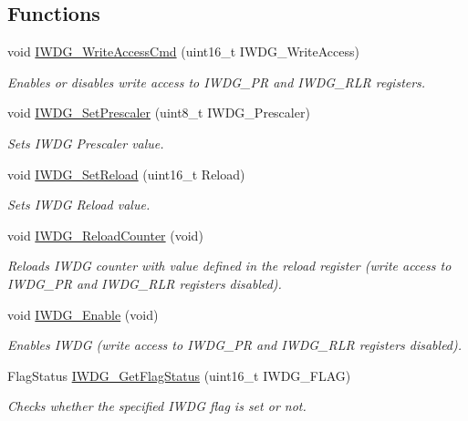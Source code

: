 \subsection*{Functions}
\begin{DoxyCompactItemize}
\item 
void \hyperlink{group___i_w_d_g_gae466681e5bdc11b353c508b89d75ca05}{I\-W\-D\-G\-\_\-\-Write\-Access\-Cmd} (uint16\-\_\-t I\-W\-D\-G\-\_\-\-Write\-Access)
\begin{DoxyCompactList}\small\item\em Enables or disables write access to I\-W\-D\-G\-\_\-\-P\-R and I\-W\-D\-G\-\_\-\-R\-L\-R registers. \end{DoxyCompactList}\item 
void \hyperlink{group___i_w_d_g_ga4fa7f1cd690533a35ad9e4729c0450a3}{I\-W\-D\-G\-\_\-\-Set\-Prescaler} (uint8\-\_\-t I\-W\-D\-G\-\_\-\-Prescaler)
\begin{DoxyCompactList}\small\item\em Sets I\-W\-D\-G Prescaler value. \end{DoxyCompactList}\item 
void \hyperlink{group___i_w_d_g_gae2a14752a0431f23cb80cebf202ac365}{I\-W\-D\-G\-\_\-\-Set\-Reload} (uint16\-\_\-t Reload)
\begin{DoxyCompactList}\small\item\em Sets I\-W\-D\-G Reload value. \end{DoxyCompactList}\item 
void \hyperlink{group___i_w_d_g_ga7147ebabdc3fef97f532b171a4e70d49}{I\-W\-D\-G\-\_\-\-Reload\-Counter} (void)
\begin{DoxyCompactList}\small\item\em Reloads I\-W\-D\-G counter with value defined in the reload register (write access to I\-W\-D\-G\-\_\-\-P\-R and I\-W\-D\-G\-\_\-\-R\-L\-R registers disabled). \end{DoxyCompactList}\item 
void \hyperlink{group___i_w_d_g_ga479b2921c86f8c67b819f5c4bea6bdb6}{I\-W\-D\-G\-\_\-\-Enable} (void)
\begin{DoxyCompactList}\small\item\em Enables I\-W\-D\-G (write access to I\-W\-D\-G\-\_\-\-P\-R and I\-W\-D\-G\-\_\-\-R\-L\-R registers disabled). \end{DoxyCompactList}\item 
Flag\-Status \hyperlink{group___i_w_d_g_ga37f050cfbedc0c15f9e0816c0b22011e}{I\-W\-D\-G\-\_\-\-Get\-Flag\-Status} (uint16\-\_\-t I\-W\-D\-G\-\_\-\-F\-L\-A\-G)
\begin{DoxyCompactList}\small\item\em Checks whether the specified I\-W\-D\-G flag is set or not. \end{DoxyCompactList}\end{DoxyCompactItemize}


